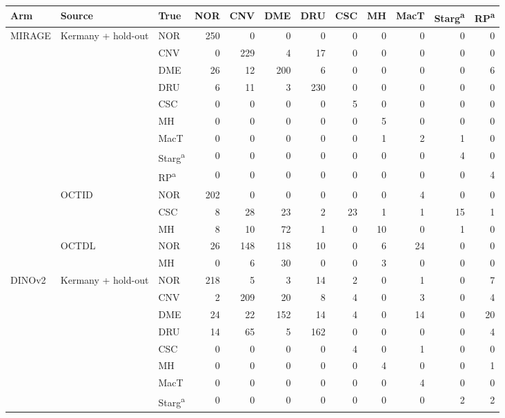 \begin{tabular}{@{}lll*{9}{r}@{}}
\toprule
Arm & Source & True & NOR & CNV & DME & DRU & CSC & MH & MacT & Starg\textsuperscript{a} & RP\textsuperscript{a} \\
\midrule
MIRAGE & Kermany + hold-out & NOR & 250 & 0 & 0 & 0 & 0 & 0 & 0 & 0 & 0 \\
 &  & CNV & 0 & 229 & 4 & 17 & 0 & 0 & 0 & 0 & 0 \\
 &  & DME & 26 & 12 & 200 & 6 & 0 & 0 & 0 & 0 & 6 \\
 &  & DRU & 6 & 11 & 3 & 230 & 0 & 0 & 0 & 0 & 0 \\
 &  & CSC & 0 & 0 & 0 & 0 & 5 & 0 & 0 & 0 & 0 \\
 &  & MH & 0 & 0 & 0 & 0 & 0 & 5 & 0 & 0 & 0 \\
 &  & MacT & 0 & 0 & 0 & 0 & 0 & 1 & 2 & 1 & 0 \\
 &  & Starg\textsuperscript{a} & 0 & 0 & 0 & 0 & 0 & 0 & 0 & 4 & 0 \\
 &  & RP\textsuperscript{a} & 0 & 0 & 0 & 0 & 0 & 0 & 0 & 0 & 4 \\
\addlinespace[1pt]
 & OCTID & NOR & 202 & 0 & 0 & 0 & 0 & 0 & 4 & 0 & 0 \\
 &  & CSC & 8 & 28 & 23 & 2 & 23 & 1 & 1 & 15 & 1 \\
 &  & MH & 8 & 10 & 72 & 1 & 0 & 10 & 0 & 1 & 0 \\
\addlinespace[1pt]
 & OCTDL & NOR & 26 & 148 & 118 & 10 & 0 & 6 & 24 & 0 & 0 \\
 &  & MH & 0 & 6 & 30 & 0 & 0 & 3 & 0 & 0 & 0 \\
\addlinespace[1pt]
\midrule
DINOv2 & Kermany + hold-out & NOR & 218 & 5 & 3 & 14 & 2 & 0 & 1 & 0 & 7 \\
 &  & CNV & 2 & 209 & 20 & 8 & 4 & 0 & 3 & 0 & 4 \\
 &  & DME & 24 & 22 & 152 & 14 & 4 & 0 & 14 & 0 & 20 \\
 &  & DRU & 14 & 65 & 5 & 162 & 0 & 0 & 0 & 0 & 4 \\
 &  & CSC & 0 & 0 & 0 & 0 & 4 & 0 & 1 & 0 & 0 \\
 &  & MH & 0 & 0 & 0 & 0 & 0 & 4 & 0 & 0 & 1 \\
 &  & MacT & 0 & 0 & 0 & 0 & 0 & 0 & 4 & 0 & 0 \\
 &  & Starg\textsuperscript{a} & 0 & 0 & 0 & 0 & 0 & 0 & 0 & 2 & 2 \\

\end{tabular}
